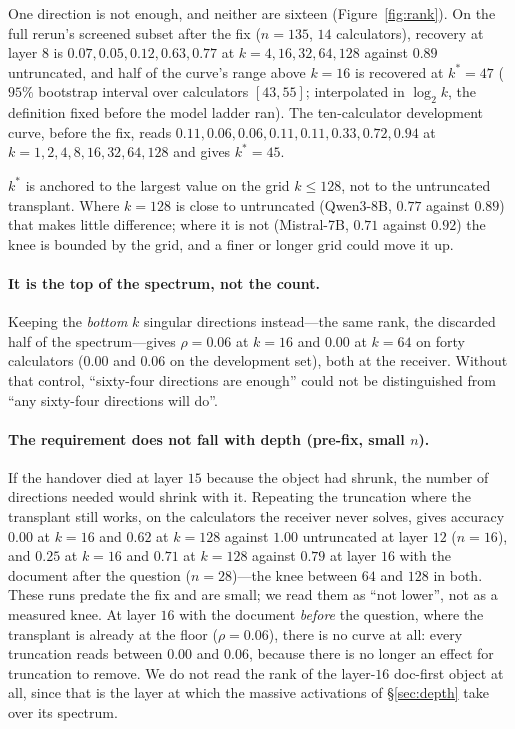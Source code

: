 \documentclass{article}
\begin{document}
One direction is not enough, and neither are sixteen
(Figure~\ref{fig:rank}). On the full rerun's screened subset after the fix
($n=135$, $14$ calculators), recovery
at layer $8$ is $0.07, 0.05, 0.12, 0.63, 0.77$ at $k = 4, 16, 32, 64, 128$
against $0.89$ untruncated, and half of the curve's range above $k=16$ is
recovered at $k^{*}=47$ ($95\%$ bootstrap interval over calculators $[43, 55]$;
interpolated in $\log_2 k$, the definition fixed before the model ladder ran).
The ten-calculator development curve, before the fix, reads
$0.11, 0.06, 0.06, 0.11, 0.11, 0.33, 0.72, 0.94$ at $k = 1,2,4,8,16,32,64,128$
and gives $k^{*}=45$.

$k^{*}$ is anchored to the largest value on the grid $k \le 128$, not to the
untruncated transplant. Where $k=128$ is close to untruncated (Qwen3-8B, $0.77$
against $0.89$) that makes little difference; where it is not (Mistral-7B,
$0.71$ against $0.92$) the knee is bounded by the grid, and a finer or longer
grid could move it up.

\paragraph{It is the top of the spectrum, not the count.} Keeping the
\emph{bottom} $k$ singular directions instead---the same rank, the discarded
half of the spectrum---gives $\rho = 0.06$ at $k=16$ and $0.00$ at $k=64$ on
forty calculators ($0.00$ and $0.06$ on the development set), both at the
receiver. Without that control, ``sixty-four directions are enough'' could not
be distinguished from ``any sixty-four directions will do''.

\paragraph{The requirement does not fall with depth (pre-fix, small $n$).} If
the handover died at layer $15$ because the object had shrunk, the number of
directions needed would shrink with it. Repeating the truncation where the
transplant still works, on the calculators the receiver never solves, gives
accuracy $0.00$ at $k=16$ and $0.62$ at $k=128$ against $1.00$ untruncated at
layer $12$ ($n=16$), and $0.25$ at $k=16$ and $0.71$ at $k=128$ against $0.79$ at
layer $16$ with the document after the question ($n=28$)---the knee between $64$
and $128$ in both. These runs predate the fix and are small; we read them as
``not lower'', not as a measured knee. At layer $16$ with the document \emph{before} the question, where the
transplant is already at the floor ($\rho=0.06$), there is no curve at all:
every truncation reads between $0.00$ and $0.06$, because there is no longer an
effect for truncation to remove. We do not read the rank of the layer-$16$
doc-first object at all, since that is the layer at which the massive
activations of \S\ref{sec:depth} take over its spectrum.
\end{document}
